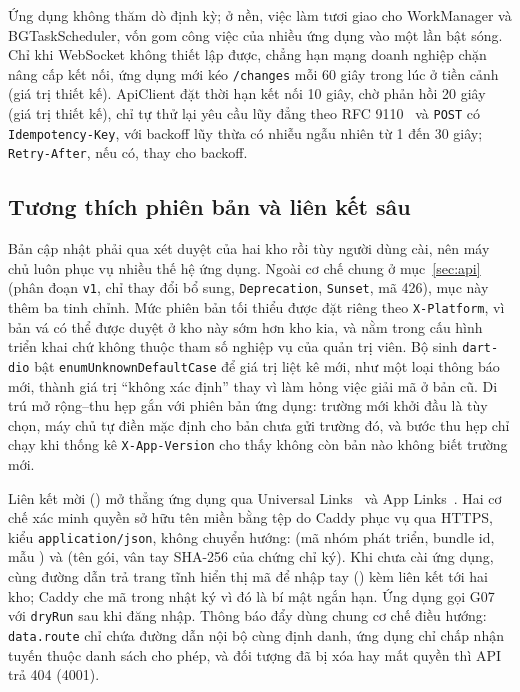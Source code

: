 Ứng dụng không thăm dò định kỳ; ở nền, việc làm tươi giao cho WorkManager và BGTaskScheduler, vốn gom công việc của nhiều ứng dụng vào một lần bật sóng. Chỉ khi WebSocket không thiết lập được, chẳng hạn mạng doanh nghiệp chặn nâng cấp kết nối, ứng dụng mới kéo \texttt{/changes} mỗi 60 giây trong lúc ở tiền cảnh (giá trị thiết kế). ApiClient đặt thời hạn kết nối 10 giây, chờ phản hồi 20 giây (giá trị thiết kế), chỉ tự thử lại yêu cầu lũy đẳng theo RFC 9110~\cite{rfc9110} và \texttt{POST} có \texttt{Idempotency-Key}, với backoff lũy thừa có nhiễu ngẫu nhiên từ 1 đến 30 giây; \texttt{Retry-After}, nếu có, thay cho backoff.

\subsection{Tương thích phiên bản và liên kết sâu}\label{ssec:phien-ban-lien-ket}

Bản cập nhật phải qua xét duyệt của hai kho rồi tùy người dùng cài, nên máy chủ luôn phục vụ nhiều thế hệ ứng dụng. Ngoài cơ chế chung ở mục~\ref{sec:api} (phân đoạn \texttt{v1}, chỉ thay đổi bổ sung, \texttt{Deprecation}, \texttt{Sunset}, mã 426), mục này thêm ba tinh chỉnh. Mức phiên bản tối thiểu được đặt riêng theo \texttt{X-Platform}, vì bản vá có thể được duyệt ở kho này sớm hơn kho kia, và nằm trong cấu hình triển khai chứ không thuộc tham số nghiệp vụ của quản trị viên. Bộ sinh \texttt{dart-dio} bật \texttt{enumUnknownDefaultCase} để giá trị liệt kê mới, như một loại thông báo mới, thành giá trị “không xác định” thay vì làm hỏng việc giải mã ở bản cũ. Di trú mở rộng–thu hẹp gắn với phiên bản ứng dụng: trường mới khởi đầu là tùy chọn, máy chủ tự điền mặc định cho bản chưa gửi trường đó, và bước thu hẹp chỉ chạy khi thống kê \texttt{X-App-Version} cho thấy không còn bản nào không biết trường mới.

Liên kết mời  () mở thẳng ứng dụng qua Universal Links~\cite{appleuniversallinks} và App Links~\cite{androidapplinks}. Hai cơ chế xác minh quyền sở hữu tên miền bằng tệp do Caddy phục vụ qua HTTPS, kiểu \texttt{application/json}, không chuyển hướng:  (mã nhóm phát triển, bundle id, mẫu ) và  (tên gói, vân tay SHA-256 của chứng chỉ ký). Khi chưa cài ứng dụng, cùng đường dẫn trả trang tĩnh hiển thị mã để nhập tay () kèm liên kết tới hai kho; Caddy che mã trong nhật ký vì đó là bí mật ngắn hạn. Ứng dụng gọi G07 với \texttt{dryRun} sau khi đăng nhập. Thông báo đẩy dùng chung cơ chế điều hướng: \texttt{data.route} chỉ chứa đường dẫn nội bộ cùng định danh, ứng dụng chỉ chấp nhận tuyến thuộc danh sách cho phép, và đối tượng đã bị xóa hay mất quyền thì API trả 404 (4001).

